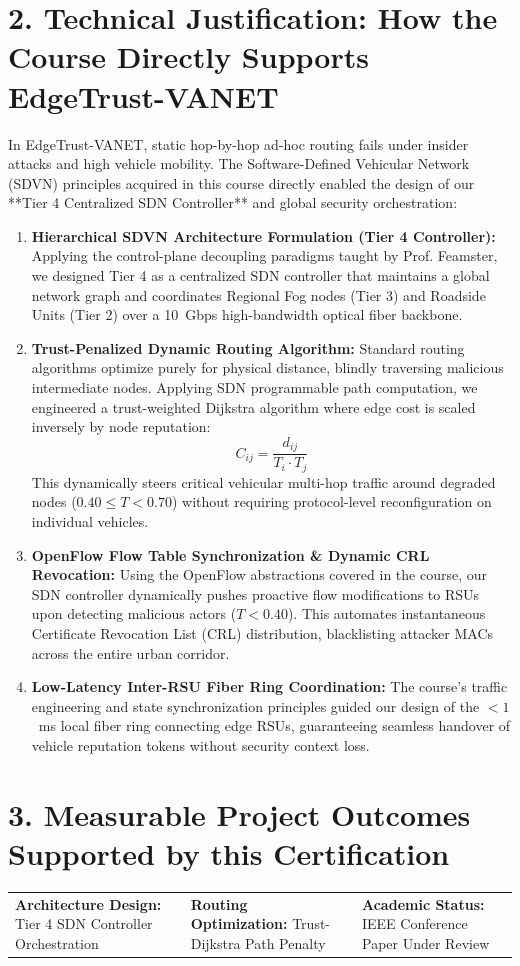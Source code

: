 \documentclass[10pt,a4paper]{article}
\begin{document}
\section*{2. Technical Justification: How the Course Directly Supports EdgeTrust-VANET}
In EdgeTrust-VANET, static hop-by-hop ad-hoc routing fails under insider attacks and high vehicle mobility. The Software-Defined Vehicular Network (SDVN) principles acquired in this course directly enabled the design of our **Tier 4 Centralized SDN Controller** and global security orchestration:

\begin{enumerate}
    \item \textbf{Hierarchical SDVN Architecture Formulation (Tier 4 Controller):} 
    Applying the control-plane decoupling paradigms taught by Prof. Feamster, we designed Tier 4 as a centralized SDN controller that maintains a global network graph and coordinates Regional Fog nodes (Tier 3) and Roadside Units (Tier 2) over a 10~Gbps high-bandwidth optical fiber backbone.

    \item \textbf{Trust-Penalized Dynamic Routing Algorithm:} 
    Standard routing algorithms optimize purely for physical distance, blindly traversing malicious intermediate nodes. Applying SDN programmable path computation, we engineered a trust-weighted Dijkstra algorithm where edge cost is scaled inversely by node reputation:
    \[
    C_{ij} = \frac{d_{ij}}{T_i \cdot T_j}
    \]
    This dynamically steers critical vehicular multi-hop traffic around degraded nodes ($0.40 \le T < 0.70$) without requiring protocol-level reconfiguration on individual vehicles.

    \item \textbf{OpenFlow Flow Table Synchronization \& Dynamic CRL Revocation:} 
    Using the OpenFlow abstractions covered in the course, our SDN controller dynamically pushes proactive flow modifications to RSUs upon detecting malicious actors ($T < 0.40$). This automates instantaneous Certificate Revocation List (CRL) distribution, blacklisting attacker MACs across the entire urban corridor.

    \item \textbf{Low-Latency Inter-RSU Fiber Ring Coordination:} 
    The course's traffic engineering and state synchronization principles guided our design of the $<1$~ms local fiber ring connecting edge RSUs, guaranteeing seamless handover of vehicle reputation tokens without security context loss.
\end{enumerate}

\section*{3. Measurable Project Outcomes Supported by this Certification}
\noindent
\begin{tabularx}{\textwidth}{@{}X X X@{}}
    \textbf{Architecture Design:} Tier 4 SDN Controller Orchestration & 
    \textbf{Routing Optimization:} Trust-Dijkstra Path Penalty & 
    \textbf{Academic Status:} IEEE Conference Paper Under Review \\
\end{tabularx}
\end{document}
